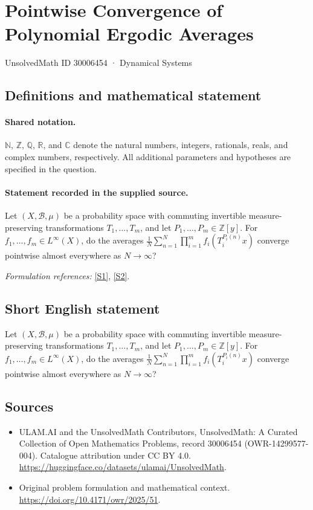 \documentclass[11pt]{article}
\newcommand{\sref}[2]{\hyperlink{source:#1:#2}{[S#2]}}
\begin{document}
\setcounter{section}{30006453}
\section{Pointwise Convergence of Polynomial Ergodic Averages}\label{30006454}
{\small UnsolvedMath ID 30006454 · Dynamical Systems}
\subsection{Definitions and mathematical statement}

\paragraph{Shared notation.}$\mathbb N$, $\mathbb Z$, $\mathbb Q$, $\mathbb R$, and $\mathbb C$ denote the natural numbers, integers, rationals, reals, and complex numbers, respectively. All additional parameters and hypotheses are specified in the question.


\paragraph{Statement recorded in the supplied source.}
Let $(X,\mathcal{B},\mu)$ be a probability space with commuting invertible measure-preserving transformations $T_1,\ldots,T_m$, and let $P_1,\ldots,P_m\in\mathbb{Z}[y]$. For $f_1,\ldots,f_m\in L^\infty(X)$, do the averages $\frac{1}{N}\sum_{n=1}^N\prod_{i=1}^m f_i(T_i^{P_i(n)}x)$ converge pointwise almost everywhere as $N\to\infty$?
\par\smallskip\textit{Formulation references:} \sref{30006454}{1}, \sref{30006454}{2}.
\subsection{Short English statement}
Let $(X,\mathcal{B},\mu)$ be a probability space with commuting invertible measure-preserving transformations $T_1,\ldots,T_m$, and let $P_1,\ldots,P_m\in\mathbb{Z}[y]$. For $f_1,\ldots,f_m\in L^\infty(X)$, do the averages $\frac{1}{N}\sum_{n=1}^N\prod_{i=1}^m f_i(T_i^{P_i(n)}x)$ converge pointwise almost everywhere as $N\to\infty$?
\subsection{Sources}
\begin{itemize}
\item[\hypertarget{source:30006454:1}{S1}] ULAM.AI and the UnsolvedMath Contributors, UnsolvedMath: A Curated Collection of Open Mathematics Problems, record 30006454 (OWR-14299577-004). Catalogue attribution under CC BY 4.0.
\url{https://huggingface.co/datasets/ulamai/UnsolvedMath}.
\item[\hypertarget{source:30006454:2}{S2}] Original problem formulation and mathematical context.
\url{https://doi.org/10.4171/owr/2025/51}.
\end{itemize}
\label{end:30006454}
\end{document}
